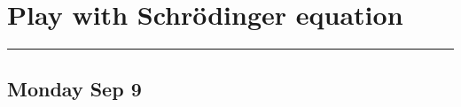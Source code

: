\section{Play with Schrödinger equation}
\vspace{-15pt}\noindent\rule{\textwidth}{0.1pt}\vspace{-10pt}
    \subsection{\hfill \small Monday Sep 9}
